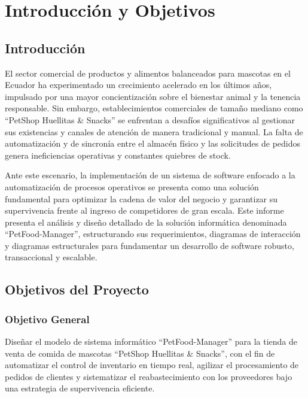 \documentclass[11pt,a4paper]{article}
\begin{document}
\newpage

\tableofcontents
\newpage

\section{Introducción y Objetivos}

\subsection{Introducción}
El sector comercial de productos y alimentos balanceados para mascotas en el Ecuador ha experimentado un crecimiento acelerado en los últimos años, impulsado por una mayor concientización sobre el bienestar animal y la tenencia responsable. Sin embargo, establecimientos comerciales de tamaño mediano como ``PetShop Huellitas \& Snacks'' se enfrentan a desafíos significativos al gestionar sus existencias y canales de atención de manera tradicional y manual. La falta de automatización y de sincronía entre el almacén físico y las solicitudes de pedidos genera ineficiencias operativas y constantes quiebres de stock. 

Ante este escenario, la implementación de un sistema de software enfocado a la automatización de procesos operativos se presenta como una solución fundamental para optimizar la cadena de valor del negocio y garantizar su supervivencia frente al ingreso de competidores de gran escala. Este informe presenta el análisis y diseño detallado de la solución informática denominada ``PetFood-Manager'', estructurando sus requerimientos, diagramas de interacción y diagramas estructurales para fundamentar un desarrollo de software robusto, transaccional y escalable.

\subsection{Objetivos del Proyecto}

\subsubsection{Objetivo General}
Diseñar el modelo de sistema informático ``PetFood-Manager'' para la tienda de venta de comida de mascotas ``PetShop Huellitas \& Snacks'', con el fin de automatizar el control de inventario en tiempo real, agilizar el procesamiento de pedidos de clientes y sistematizar el reabastecimiento con los proveedores bajo una estrategia de supervivencia eficiente.
\end{document}

